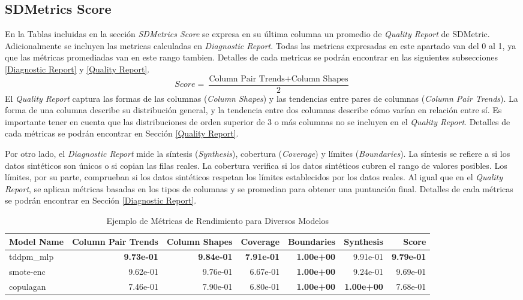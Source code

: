 \newpage
\subsection{SDMetrics Score}
En la Tablas incluidas en la sección \emph{SDMetrics Score} se expresa en su última columna un promedio de \emph{Quality Report} de SDMetric. Adicionalmente se incluyen las metricas calculadas en \emph{Diagnostic Report}. Todas las metricas expresadas en este apartado van del 0 al 1, ya que las métricas promediadas van en este rango tambien. Detalles de cada metricas se podrán encontrar en las siguientes subsecciones \ref{Diagnostic Report} y \ref{Quality Report}.
\[
    Score = \frac{\text{Column Pair Trends}+\text{Column Shapes}}{2}
\]
El \emph{Quality Report} captura las formas de las columnas (\emph{Column Shapes}) y las tendencias entre pares de columnas (\emph{Column Pair Trends}). La forma de una columna describe su distribución general, y la tendencia entre dos columnas describe cómo varían en relación entre sí. Es importante tener en cuenta que las distribuciones de orden superior de 3 o más columnas no se incluyen en el \emph{Quality Report}. Detalles de cada métricas se podrán encontrar en Sección \ref{Quality Report}.

Por otro lado, el \emph{Diagnostic Report} mide la síntesis (\emph{Synthesis}), cobertura (\emph{Coverage}) y límites (\emph{Boundaries}). La síntesis se refiere a si los datos sintéticos son únicos o si copian las filas reales. La cobertura verifica si los datos sintéticos cubren el rango de valores posibles. Los límites, por su parte, comprueban si los datos sintéticos respetan los límites establecidos por los datos reales. Al igual que en el \emph{Quality Report}, se aplican métricas basadas en los tipos de columnas y se promedian para obtener una puntuación final. Detalles de cada métricas se podrán encontrar en Sección \ref{Diagnostic Report}.

\begin{table}[H]
    \centering
    \fontsize{10}{14}\selectfont
    \caption{Ejemplo de Métricas de Rendimiento para Diversos Modelos}
    \label{example-table-score}
    \begin{tabular}{|l|r|r|r|r|r|r|}
    \hline
    \rowcolor[gray]{0.8}
    Model Name & Column Pair Trends & Column Shapes & Coverage & Boundaries & Synthesis & \textbf{Score} \\
    \hline tddpm\_mlp & \bfseries 9.73e-01 & \bfseries 9.84e-01 & \bfseries 7.91e-01 & \bfseries 1.00e+00 & 9.91e-01 & \bfseries 9.79e-01 \\
    \hline smote-enc & 9.62e-01 & 9.76e-01 & 6.67e-01 & \bfseries 1.00e+00 & 9.24e-01 & 9.69e-01 \\
    \hline copulagan & 7.46e-01 & 7.90e-01 & 6.80e-01 & \bfseries 1.00e+00 & \bfseries 1.00e+00 & 7.68e-01 \\
    \hline
    \end{tabular}
\end{table}

